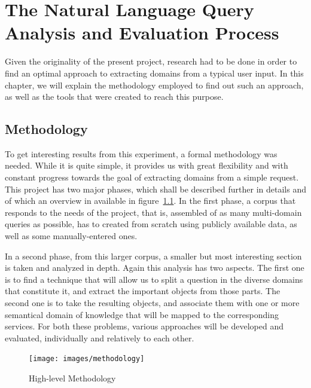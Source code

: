\chapter{The Natural Language Query Analysis and Evaluation Process} %
\label{cha:specifications}

Given the originality of the present project, research had to be done in order to find an optimal approach to extracting domains from a typical user input. In this chapter, we will explain the methodology employed to find out such an approach, as well as the tools that were created to reach this purpose.

\section{Methodology} %
\label{sec:methodology}

To get interesting results from this experiment, a formal methodology was needed. While it is quite simple, it provides us with great flexibility and with constant progress towards the goal of extracting domains from a simple request. This project has two major phases, which shall be described further in details and of which an overview in available in figure~\ref{fig:methodology}. In the first phase, a corpus that responds to the needs of the project, that is, assembled of as many multi-domain queries as possible, has to created from scratch using publicly available data, as well as some manually-entered ones.

In a second phase, from this larger corpus, a smaller but most interesting section is taken and analyzed in depth. Again this analysis has two aspects. The first one is to find a technique that will allow us to split a question in the diverse domains that constitute it, and extract the important objects from those parts. The second one is to take the resulting objects, and associate them with one or more semantical domain of knowledge that will be mapped to the corresponding services. For both these problems, various approaches will be developed and evaluated, individually and relatively to each other.

\begin{figure}[ht!]
  \begin{center}
    \texttt{[image: images/methodology]}
  \end{center}
  \caption{High-level Methodology}\label{fig:methodology}
\end{figure}

